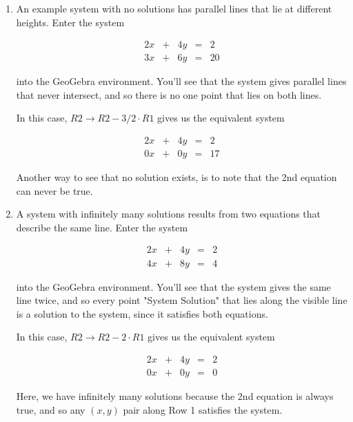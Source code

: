 \documentclass{ximera}
\begin{document}
        \begin{solution}
    
            \begin{enumerate}
    
                \item An example system with no solutions has parallel lines that lie at different heights. Enter the system
    
                    $$\begin{array}{ccccc}
                            2x & +&4y&=&2 \\
                            3x& +&6y&=&20
                        \end{array}$$
    
                    into the GeoGebra environment. You'll see that the system gives parallel lines that never intersect, and so there is no one point that lies on both lines. 
    
                    In this case, $R2\rightarrow R2-3/2\cdot R1$ gives us the equivalent system
    
                    $$\begin{array}{ccccc}
                            2x & +&4y&=&2 \\
                            0x& +&0y&=&17
                        \end{array}$$
    
                    Another way to see that no solution exists, is to note that the 2nd equation can never be true.
    
                \item A system with infinitely many solutions results from two equations that describe the same line. Enter the system
    
                    $$\begin{array}{ccccc}
                            2x & +&4y&=&2 \\
                            4x& +&8y&=&4
                        \end{array}$$
    
                    into the GeoGebra environment. You'll see that the system gives the same line twice, and so every point "System Solution" that lies along the visible line is a solution to the system, since it satisfies both equations.
    
                    In this case, $R2\rightarrow R2-2\cdot R1$ gives us the equivalent system
    
                    $$\begin{array}{ccccc}
                            2x & +&4y&=&2 \\
                            0x& +&0y&=&0
                        \end{array}$$
    
                    Here, we have infinitely many solutions because the 2nd equation is always true, and so any $(x,y)$ pair along Row 1 satisfies the system.
    
            \end{enumerate}
               
    
        \end{solution}
    
\end{document}
